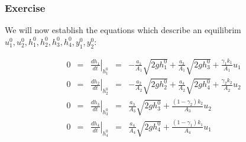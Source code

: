 \subsubsection{Exercise} 

We will now establish the equations which describe an equilibrim $u_1^0,u_2^0,h_1^0,h_2^0,h_3^0,h_4^0,y_1^0,y_2^0$:

$$
        \begin{array}{rcccl}
    0 & = & \left.\frac{dh_1}{dt}\right|_{h_1^0} & = &
            - \frac{a_1}{A_1}\sqrt{2gh_1^0} + \frac{a_3}{A_1}\sqrt{2gh_3^0} + \frac{\gamma_1k_1}{A_1}u_1\\ 

    0 & = & \left.\frac{dh_2}{dt}\right|_{h_2^0} & = &
            - \frac{a_2}{A_2}\sqrt{2gh_2^0} + \frac{a_4}{A_2}\sqrt{2gh_4^0} + \frac{\gamma_2k_2}{A_2}u_2\\ 

    0 & = & \left.\frac{dh_3}{dt}\right|_{h_3^0} & = &
            \frac{a_3}{A_3}\sqrt{2gh_3^0}+\frac{(1-\gamma_2)k_2}{A_3}u_2 \\ 

    0 & = & \left.\frac{dh_4}{dt}\right|_{h_4^0} & = &
            \frac{a_4}{A_4}\sqrt{2gh_4^0}+\frac{(1-\gamma_1)k_1}{A_4}u_1 \\ 
        \end{array}
$$
